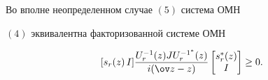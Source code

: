 \begin{thm}


Во вполне неопределенном случае $(5)$ система ОМН


$(4)$ эквивалентна факторизованной системе ОМН


\begin{equation}


[ s_r(z)\, I] \frac {U_r^{-1}(z)JU_r^{-1^*}(z)}{i(\ov z-z)}


\begin{bmatrix} s_r^*(z) \\ I \end{bmatrix} \geq 0.


\end{equation}


\end{thm}





